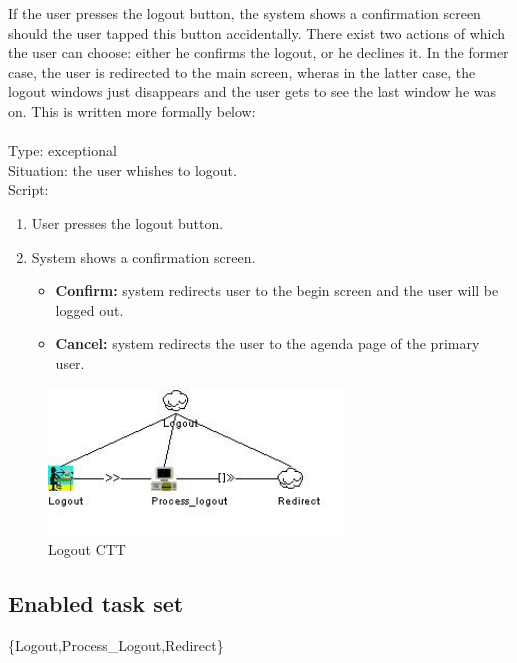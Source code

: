 \documentclass[11pt, a4paper,svglistings]{report}
\begin{document}
If the user presses the logout button, the system shows a confirmation screen should the user tapped this button accidentally. There exist two actions of which the user can choose: either he confirms the logout, or he declines it. In the former case, the user is redirected to the main screen, wheras in the latter case, the logout windows just disappears and the user gets to see the last window he was on. This is written more formally below:\\ \\
Type: exceptional \\
Situation: the user whishes to logout. \\
Script:
\begin{enumerate}
\item User presses the logout button.
\item System shows a confirmation screen.
\begin{itemize}
\item \textbf{Confirm:} system redirects user to the begin screen and the user will be logged out.
\item \textbf{Cancel:} system redirects the user to the agenda page of the primary user.
\end{itemize}
\end{enumerate}

\begin{figure}[H]
\centering
    \includegraphics[width=0.7\textwidth]{Logout.jpg}
  \caption[Logout CTT]{\label{fig:Logout}Logout CTT}
\end{figure}

\subsection{Enabled task set}

\{Logout,Process\_Logout,Redirect\}


\newpage
\end{document}
